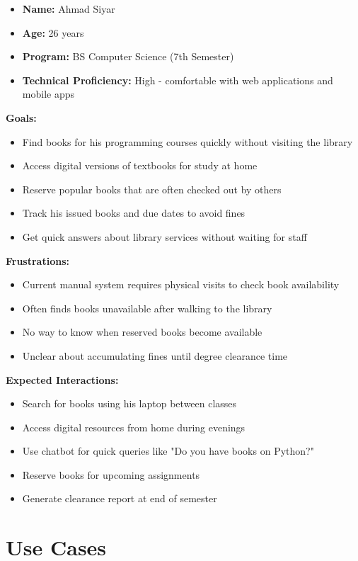 \documentclass[12pt,a4paper]{report}
\begin{document}
\begin{itemize}
    \item \textbf{Name:} Ahmad Siyar
    \item \textbf{Age:} 26 years
    \item \textbf{Program:} BS Computer Science (7th Semester)
    \item \textbf{Technical Proficiency:} High - comfortable with web applications and mobile apps
\end{itemize}
\textbf{Goals:}
\begin{itemize}
    \item Find books for his programming courses quickly without visiting the library
    \item Access digital versions of textbooks for study at home
    \item Reserve popular books that are often checked out by others
    \item Track his issued books and due dates to avoid fines
    \item Get quick answers about library services without waiting for staff
\end{itemize}
\textbf{Frustrations:}
\begin{itemize}
    \item Current manual system requires physical visits to check book availability
    \item Often finds books unavailable after walking to the library
    \item No way to know when reserved books become available
    \item Unclear about accumulating fines until degree clearance time
\end{itemize}
\textbf{Expected Interactions:}
\begin{itemize}
    \item Search for books using his laptop between classes
    \item Access digital resources from home during evenings
    \item Use chatbot for quick queries like "Do you have books on Python?"
    \item Reserve books for upcoming assignments
    \item Generate clearance report at end of semester
\end{itemize}

\section{Use Cases}
\label{sec:usecases}
\end{document}
